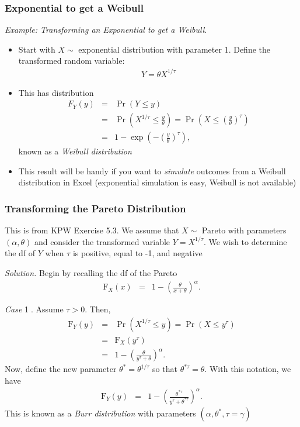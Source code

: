 \documentclass{beamer}
\begin{document}
\begin{frame}[shrink=2]
\frametitle{Exponential to get a Weibull}
\textit{Example: Transforming an Exponential to get a Weibull}.
\begin{itemize}
\item Start with $X \sim $ exponential distribution with parameter 1. Define the transformed random
variable:
\begin{eqnarray*}
Y = \theta X^{1/\tau}
\end{eqnarray*} \vspace{2mm}

\item This has distribution
\begin{eqnarray*}
F_Y(y) &=& \Pr(Y \le y)\\
&=& \Pr(X^{1/\tau} \le \frac{y}{\theta}) = \Pr(X \le (\frac{y}{\theta})^{\tau})\\
&=& 1 - \exp\left(-(\frac{y}{\theta})^\tau\right) ,
\end{eqnarray*}
known as a \textit{Weibull distribution} \vspace{2mm}

\item This result will be handy if you want to \emph{simulate} outcomes from a Weibull distribution in Excel (exponential simulation is easy, Weibull is not available)
\end{itemize}
\end{frame}

\begin{frame}[shrink=2]
\frametitle{Transforming the Pareto Distribution} This is from KPW
Exercise 5.3. We assume that $X \sim$  Pareto with parameters
$(\alpha, \theta)$ and consider the transformed variable $Y =
X^{1/\tau}$. We wish to determine the df of $Y$ when $\tau$ is
positive, equal to -1, and negative

\bigskip

\textit{Solution.} Begin by recalling the df of the Pareto
\begin{eqnarray*}
\mathrm{F}_X (x) &=& 1 - \left(\frac{\theta}{x+\theta}\right)^{\alpha} .
\end{eqnarray*}

\textit{Case} \textcircled{1}. Assume $\tau > 0$. Then,
\begin{eqnarray*}
\mathrm{F}_Y (y) &=& \Pr (X^{1/\tau} \le y ) = \Pr (X \le y^\tau ) \\
& =& \mathrm{F}_X (y^\tau)\\
&=& 1 - \left(\frac{\theta}{y^\tau+\theta}\right)^{\alpha} .
\end{eqnarray*}
Now, define the new parameter $\theta^{\ast} = \theta^{1/\tau} $ so that $\theta^{\ast \tau} = \theta$. With this notation, we have
\begin{eqnarray*}
\mathrm{F}_Y (y) &=& 1 - \left(\frac{\theta^{\ast \tau}}{y^{\tau}+\theta^{\ast \tau}}\right)^{\alpha} .
\end{eqnarray*}
This is known as a \emph{Burr distribution} with parameters $
(\alpha, \theta^{\ast}, \tau = \gamma)$
\end{frame}
\end{document}
